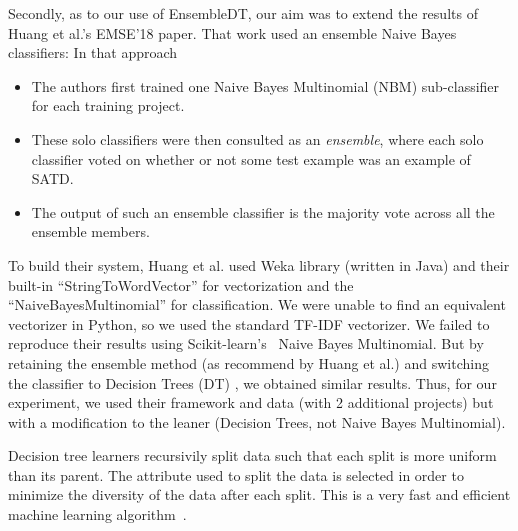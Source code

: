 \documentclass[10pt,conference]{IEEEtran}
\newcommand{\bi}{\begin{itemize}}
\newcommand{\ei}{\end{itemize}}
\begin{document}
Secondly, as to our use of EnsembleDT,
our aim was to extend the results of   Huang et al.'s EMSE'18 paper. 
That work used an ensemble Naive Bayes classifiers:
In that approach
\bi
\item
The authors first trained one Naive Bayes Multinomial (NBM) sub-classifier for each training project.
\item
These solo classifiers were then consulted as an {\em ensemble},
where each solo classifier voted on whether or
not some test example was an example of SATD. 
\item
The output of such an ensemble classifier is the majority vote across all the ensemble members.
\ei
To build their system, Huang et al.
 used   Weka      library (written in Java)\cite{witten1999weka} and their  built-in ``StringToWordVector'' for vectorization and the ``NaiveBayesMultinomial'' for classification. 
We were unable to find an equivalent vectorizer in Python, so we  used the standard
TF-IDF vectorizer. 
We failed to reproduce their results using Scikit-learn's~\cite{scikit-learn} Naive Bayes Multinomial. 
But by retaining the ensemble method (as recommend by Huang et al.)
and switching the classifier to Decision Trees (DT) , we obtained   similar results. 
Thus, for our experiment, we used their framework and   data (with 2 additional projects) but with a modification to
the leaner (Decision Trees, not Naive Bayes Multinomial). 


 

 Decision tree learners recursivily split data such that
 each split is more uniform than its parent. 
 The attribute used to split the data
   is selected in order to minimize the diversity of the data
after each split.
This is a very fast and efficient machine learning algorithm~\cite{safavian1991survey}. 







%
%
 
\end{document}

